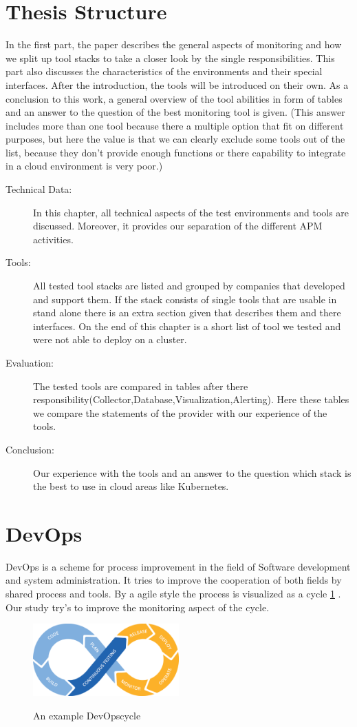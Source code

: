 \section{Thesis Structure}
In the first part, the paper describes the general aspects of monitoring and how we split up tool stacks to take a closer look by the single responsibilities. This part also discusses the characteristics of the environments and their special interfaces. After the introduction, the tools will be introduced on their own. As a conclusion to this work, a general overview  of the tool abilities in form of tables and an answer to the question of the best monitoring tool is given. (This answer includes more than one tool because there a multiple option that fit on different purposes, but here the value is that we can clearly exclude some tools out of the list, because they don't provide enough functions or there capability to integrate in a cloud environment is very poor.)
\begin{description}
\item[Technical Data:] In this chapter, all technical aspects of the test environments and tools are discussed. Moreover, it provides our separation of the different APM activities. 
\item[Tools:] All tested tool stacks are listed and grouped by companies that developed and support them. If the stack consists of single tools that are usable in stand alone there is an extra section given that describes them and there interfaces. On the end of this chapter is a short list of tool we tested and were not able to deploy on a cluster.
\item[Evaluation:]The tested tools are compared in tables after there responsibility(Collector,Database,Visualization,Alerting). Here these tables we compare the statements of the provider with our experience of the tools.
\item[Conclusion:] Our experience with the tools and an answer to the question which stack is the best to use in cloud areas like Kubernetes.

\end{description}


\section{DevOps}
\label{devops}
DevOps is a scheme for process improvement in the field of Software development and system administration\cite{Bass:2015:DSA:2810087}. It tries to improve the cooperation of both fields by shared process and tools.
By a agile style the process is visualized as a cycle \cref{fig:devopscycle} . Our study try's to improve the monitoring aspect of the cycle.
\begin{figure}
	\centering
	\includegraphics[width=0.5\textwidth]{Bilder/devopscycle}
	\caption{An example DevOpscycle}
	\label{fig:devopscycle}
	\cite{Devops}
\end{figure}